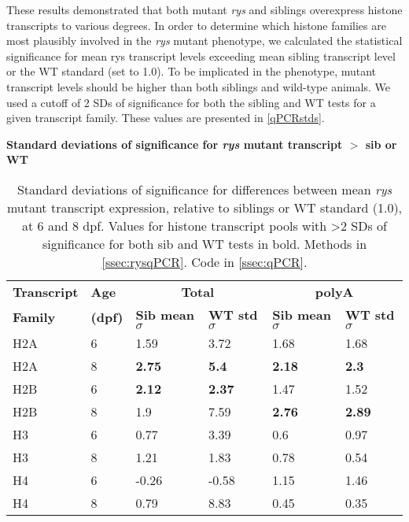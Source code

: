 These results demonstrated that both mutant \textit{rys} and siblings overexpress histone transcripts to various degrees. In order to determine which histone families are most plausibly involved in the \textit{rys} mutant phenotype, we calculated the statistical significance for mean rys transcript levels exceeding mean sibling transcript level or the WT standard (set to 1.0). To be implicated in the phenotype, mutant transcript levels should be higher than both siblings and wild-type animals. We used a cutoff of 2 SDs of significance for both the sibling and WT tests for a given transcript family. These values are presented in \autoref{qPCRstds}.

\begin{table}[!ht]
    \centering
    \caption{{\bf Standard deviations of significance for \textit{rys} mutant transcript $>$ sib or WT}}
    \begin{tabular}{|l|l|l|l|l|l|} 
        \hline {\bf Transcript} & {\bf Age} & \multicolumn{2}{c|}{\bf{Total}} & \multicolumn{2}{c|}{\bf{polyA}}\\ \cline{3-6}
        {\bf Family} & {\bf (dpf)} & {\bf Sib mean $\sigma$} & {\bf WT std $\sigma$} & {\bf Sib mean $\sigma$} & {\bf WT std $\sigma$}\\ \hline 
        H2A & 6 & 1.59 & 3.72 & 1.68 & 1.68\\ \hline
        H2A & 8 & {\bf 2.75} & {\bf 5.4} & {\bf 2.18} & {\bf 2.3}\\ \hline
        H2B & 6 & {\bf 2.12} & {\bf 2.37} & 1.47 & 1.52\\ \hline
        H2B & 8 & 1.9 & 7.59 & {\bf 2.76} & {\bf 2.89}\\ \hline
        H3 & 6 & 0.77 & 3.39 & 0.6 & 0.97\\ \hline
        H3 & 8 & 1.21 & 1.83 & 0.78 & 0.54\\ \hline
        H4 & 6 & -0.26 & -0.58 & 1.15 & 1.46\\ \hline
        H4 & 8 & 0.79 & 8.83 & 0.45 & 0.35\\ \hline
    \end{tabular}
    \caption{    \label{qPCRstds}
    Standard deviations of significance for differences between mean \textit{rys} mutant transcript expression, relative to siblings or WT standard (1.0), at 6 and 8 dpf. Values for histone transcript pools with \textgreater2 SDs of significance for both sib and WT tests in bold. 
    Methods in \autoref{ssec:rysqPCR}.
    Code in \autoref{ssec:qPCR}.
    }
\end{table}

